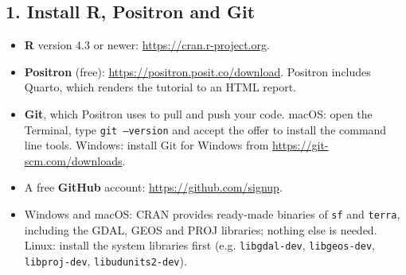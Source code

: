\documentclass[11pt,a4paper]{article}
\begin{document}
\subsection{1. Install R, Positron and Git}
\begin{itemize}[leftmargin=*]
\item \textbf{R} version 4.3 or newer: \url{https://cran.r-project.org}.
\item \textbf{Positron} (free): \url{https://positron.posit.co/download}. Positron includes Quarto, which renders the tutorial to an HTML report.
\item \textbf{Git}, which Positron uses to pull and push your code. macOS: open the Terminal, type \texttt{git --version} and accept the offer to install the command line tools. Windows: install Git for Windows from \url{https://git-scm.com/downloads}.
\item A free \textbf{GitHub} account: \url{https://github.com/signup}.
\item Windows and macOS: CRAN provides ready-made binaries of \texttt{sf} and \texttt{terra}, including the GDAL, GEOS and PROJ libraries; nothing else is needed. Linux: install the system libraries first (e.g. \texttt{libgdal-dev}, \texttt{libgeos-dev}, \texttt{libproj-dev}, \texttt{libudunits2-dev}).
\end{itemize}
\end{document}
